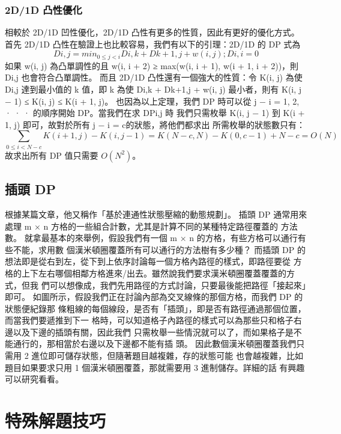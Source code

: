 \documentclass{article}
\begin{document}
\subsubsection{2D/1D 凸性優化}
相較於 2D/1D 凹性優化，2D/1D 凸性有更多的性質，因此有更好的優化方式。首先
2D/1D 凸性在驗證上也比較容易，我們有以下的引理：2D/1D 的 DP 式為
$$ Di,j = min_{0≤j<i} Di,k + Dk+1,j + w(i, j) ; Di,i = 0$$
如果 w(i, j) 為凸單調性的且 w(i, i + 2) ≥ max(w(i, i + 1), w(i + 1, i + 2))，則 Di,j 也會符合凸單調性。
而且 2D/1D 凸性還有一個強大的性質：令 K(i, j) 為使 Di,j 達到最小值的 k 值，即 k 為使
Di,k + Dk+1,j + w(i, j) 最小者，則有 K(i, j − 1) ≤ K(i, j) ≤ K(i + 1, j)。
也因為以上定理，我們 DP 時可以從 j − i = 1, 2, · · · 的順序開始 DP。當我們在求 DPi,j 時
我們只需枚舉 K(i, j − 1) 到 K(i + 1, j) 即可，故對於所有 j − i = c的狀態，將他們都求出
所需枚舉的狀態數只有：
$$\sum_{0≤i<N−c} K(i + 1, j) − K(i, j − 1) = K(N − c, N) − K(0, c − 1) + N − c = O(N)$$
故求出所有 DP 值只需要 $O(N^2)$。

\subsection{插頭 DP}
根據某篇文章，他又稱作「基於連通性狀態壓縮的動態規劃」。
插頭 DP 通常用來處理 m × n 方格的一些組合計數，尤其是計算不同的某種特定路徑覆蓋的
方法數。
就拿最基本的來舉例，假設我們有一個 m × n 的方格，有些方格可以通行有些不能，求用數
個漢米頓圈覆蓋所有可以通行的方法樹有多少種？
而插頭 DP 的想法即是從右到左，從下到上依序討論每一個方格內路徑的樣式，即路徑要從
方格的上下左右哪個相鄰方格進來/出去。雖然說我們要求漢米頓圈覆蓋覆蓋的方式，但我
們可以想像成，我們先用路徑的方式討論，只要最後能把路徑「接起來」即可。
如圖所示，假設我們正在討論內部為交叉線條的那個方格，而我們 DP 的狀態便紀錄那
條粗線的每個線段，是否有「插頭」，即是否有路徑通過那個位置，而當我們要遞推到下一
格時，可以知道格子內路徑的樣式可以為那些只和格子右邊以及下邊的插頭有關，因此我們
只需枚舉一些情況就可以了，而如果格子是不能通行的，那相當於右邊以及下邊都不能有插
頭。
因此數個漢米頓圈覆蓋我們只需用 2 進位即可儲存狀態，但隨著題目越複雜，存的狀態可能
也會越複雜，比如題目如果要求只用 1 個漢米頓圈覆蓋，那就需要用 3 進制儲存。詳細的話
有興趣可以研究看看。


\section{特殊解題技巧}
\end{document}
